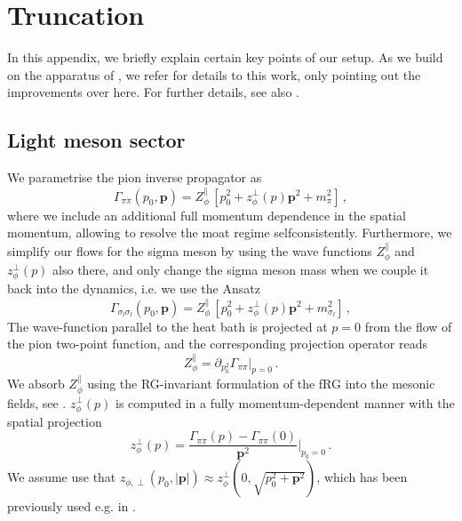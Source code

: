 \documentclass[10pt,prd,superscriptaddress,twocolumn]{revtex4-2}
\begin{document}
\appendix



\section{Truncation}
\label{app:setup}

In this appendix, we briefly explain certain key points of our setup. As we build on the apparatus of \cite{Ihssen:2024miv}, we refer for details to this work, only pointing out the improvements over \cite{Ihssen:2024miv} here. For further details, see also \cite{Sattler:2025hcg}.


\subsection{Light meson sector}
\label{sec:QCDPD_setup_meson}

We parametrise the pion inverse propagator as 
%
\begin{equation}
	\Gamma_{\pi\pi}(p_0, \boldsymbol{p}) = Z_\phi^\parallel\,\left[ p_0^2 + z_\phi^\perp(p) \boldsymbol{p}^2 + m_\pi^2 \right]
	\,,
\end{equation}
%
where we include an additional full momentum dependence in the spatial momentum, allowing to resolve the moat regime selfconsistently.
Furthermore, we simplify our flows for the sigma meson by using the wave functions $Z_\phi^\parallel$ and $z_\phi^\perp(p)$ also there, and only change the sigma meson mass when we couple it back into the dynamics, i.e. we use the Ansatz
%
\begin{equation}
	\Gamma_{\sigma_l\sigma_l}(p_0, \boldsymbol{p}) = Z_\phi^\parallel\,\left[ p_0^2 + z_\phi^\perp(p) \boldsymbol{p}^2 + m_{\sigma_l}^2 \right]
	\,,
\end{equation}
%
The wave-function parallel to the heat bath is projected at $p = 0$ from the flow of the pion two-point function, and the corresponding projection operator reads
%
\begin{equation}
	Z_{\phi}^\parallel = \partial_{p_0^2} \Gamma_{\pi\pi}\Big\vert_{p=0}
	\,.
\end{equation}
%
We absorb $Z_\phi^\parallel$ using the RG-invariant formulation of the fRG into the mesonic fields, see \cite{Ihssen:2024miv}. $z_\phi^\perp(p)$ is computed in a fully momentum-dependent manner with the spatial projection
%
\begin{equation}
	z_\phi^\perp(p) = \frac{\Gamma_{\pi\pi}(p) - \Gamma_{\pi\pi}(0)}{\boldsymbol{p}^2}   \Bigg\vert_{p_0=0}
	\,.
\end{equation}
%
We assume use that $z_{\phi,\perp}(p_0,|\boldsymbol{p}|) \approx z_\phi^\perp(0, \sqrt{p_0^2 + \boldsymbol{p}^2})$, which has been previously used e.g. in \cite{Cyrol:2017qkl}.
\end{document}
